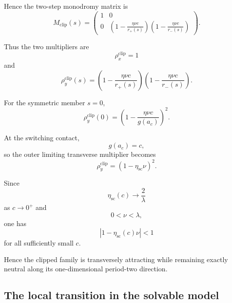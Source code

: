 Hence the two-step monodromy matrix is
\begin{equation}
M_{\mathrm{clip}}(s)
=
\begin{pmatrix}
1&0
\\
0&
\displaystyle
\left(
1-\frac{\eta\nu c}{r_+(s)}
\right)
\left(
1-\frac{\eta\nu c}{r_-(s)}
\right)
\end{pmatrix}.
\label{eq:family-monodromy}
\end{equation}

Thus the two multipliers are
\begin{equation}
\boxed{
\rho_x^{\mathrm{clip}}=1
}
\label{eq:planar-unit-multiplier}
\end{equation}
and
\begin{equation}
\boxed{
\rho_y^{\mathrm{clip}}(s)
=
\left(
1-\frac{\eta\nu c}{r_+(s)}
\right)
\left(
1-\frac{\eta\nu c}{r_-(s)}
\right).
}
\label{eq:planar-transverse-multiplier}
\end{equation}

For the symmetric member $s=0$,
\begin{equation}
\rho_y^{\mathrm{clip}}(0)
=
\left(
1-\frac{\eta\nu c}{g(a_c)}
\right)^2.
\label{eq:symmetric-clipped-transverse}
\end{equation}

At the switching contact,
\[
g(a_c)=c,
\]
so the outer limiting transverse multiplier becomes
\begin{equation}
\rho_y^{\mathrm{clip}}
=
(1-\eta_{\mathrm{sc}}\nu)^2.
\label{eq:transverse-contact-limit}
\end{equation}

Since
\[
\eta_{\mathrm{sc}}(c)
\to
\frac{2}{\lambda}
\]
as $c\to0^+$ and
\[
0<\nu<\lambda,
\]
one has
\[
\left|
1-\eta_{\mathrm{sc}}(c)\nu
\right|
<1
\]
for all sufficiently small $c$.

Hence the clipped family is transversely attracting while remaining
exactly neutral along its one-dimensional period-two direction.

\subsection{The local transition in the solvable model}
\label{subsec:planar-transition-summary}

